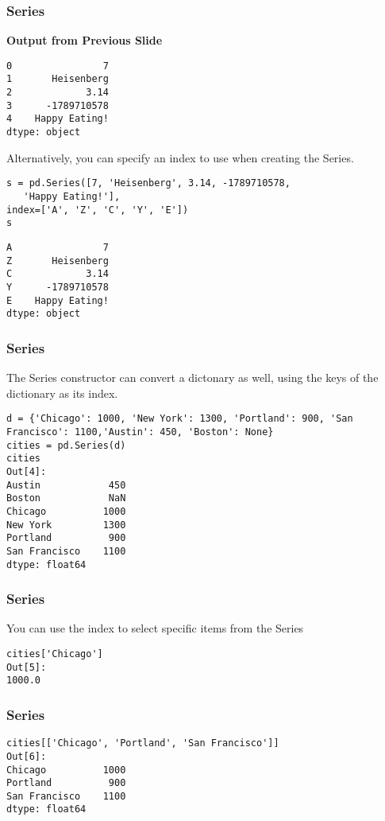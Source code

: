 \begin{frame}[fragile]\frametitle{Series}
\textbf{Output from Previous Slide}
\begin{lstlisting}
0                7
1       Heisenberg
2             3.14
3      -1789710578
4    Happy Eating!
dtype: object
\end{lstlisting}
\end{frame}

\begin{frame}[fragile]
Alternatively, you can specify an index to use when creating the Series.
\begin{lstlisting}
s = pd.Series([7, 'Heisenberg', 3.14, -1789710578, 
   'Happy Eating!'],
index=['A', 'Z', 'C', 'Y', 'E'])
s
\end{lstlisting}
\begin{lstlisting}
A                7
Z       Heisenberg
C             3.14
Y      -1789710578
E    Happy Eating!
dtype: object
\end{lstlisting}
\end{frame}

\begin{frame}[fragile]\frametitle{Series}		
The Series constructor can convert a dictonary as well, using the keys of the dictionary as its index.
\begin{lstlisting}
d = {'Chicago': 1000, 'New York': 1300, 'Portland': 900, 'San Francisco': 1100,'Austin': 450, 'Boston': None}
cities = pd.Series(d)
cities
Out[4]:
Austin            450
Boston            NaN
Chicago          1000
New York         1300
Portland          900
San Francisco    1100
dtype: float64
\end{lstlisting}
\end{frame}

\begin{frame}[fragile]\frametitle{Series}		
You can use the index to select specific items from the Series 
\begin{lstlisting}
cities['Chicago']
Out[5]:
1000.0
\end{lstlisting}
\end{frame}

\begin{frame}[fragile]\frametitle{Series}		
\begin{lstlisting}
cities[['Chicago', 'Portland', 'San Francisco']]
Out[6]:
Chicago          1000
Portland          900
San Francisco    1100
dtype: float64
\end{lstlisting}
\end{frame}

